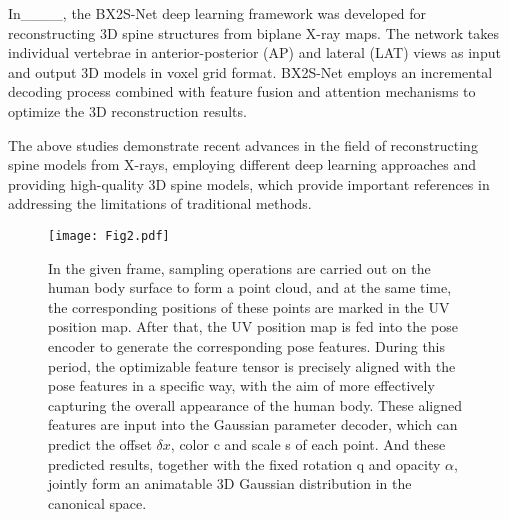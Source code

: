 In____, the BX2S-Net deep learning framework was developed for reconstructing 3D spine structures from biplane X-ray maps. The network takes individual vertebrae in anterior-posterior (AP) and lateral (LAT) views as input and output 3D models in voxel grid format. BX2S-Net employs an incremental decoding process combined with feature fusion and attention mechanisms to optimize the 3D reconstruction results.
\par The above studies demonstrate recent advances in the field of reconstructing spine models from X-rays, employing different deep learning approaches and providing high-quality 3D spine models, which provide important references in addressing the limitations of traditional methods. 

\begin{figure*}
	\centering
     \texttt{[image: Fig2.pdf]}
	\caption{In the given frame, sampling operations are carried out on the human body surface to form a point cloud, and at the same time, the corresponding positions of these points are marked in the UV position map. After that, the UV position map is fed into the pose encoder to generate the corresponding pose features. During this period, the optimizable feature tensor is precisely aligned with the pose features in a specific way, with the aim of more effectively capturing the overall appearance of the human body. These aligned features are input into the Gaussian parameter decoder, which can predict the offset $\delta x$, color c and scale s of each point. And these predicted results, together with the fixed rotation q and opacity $\alpha$, jointly form an animatable 3D Gaussian distribution in the canonical space.}
    \label{network}
\end{figure*}

